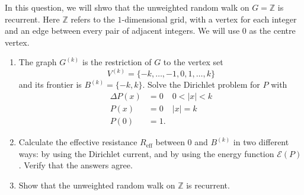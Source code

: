 \documentclass[12 pt, letterpaper]{hmcpset}
\begin{document}
\begin{problem}[45.]
	In this question, we will shwo that the unweighted random walk on $G = \mathbb{Z}$ is recurrent. Here $\mathbb{Z}$ refers to the  $1$-dimensional grid, with a vertex for each integer and an edge between every pair of adjacent integers. We will use $0$ as the centre vertex.
	\begin{enumerate}
		\item The graph $G^{(k)}$ is the restriction of $G$ to the vertex set
			\[
				V^{(k)} = \{ -k, \dots, -1, 0, 1, \dots, k \}
			\]
			and its frontier is $B^{(k)} = \{ -k, k \}$. Solve the Dirichlet problem for $P$ with
			\begin{align*}
				\Delta P(x) & = 0 & 0 < \lvert x \rvert < k \\
				P(x) & = 0 & \lvert x \rvert = k \\
				P(0) & = 1.
			\end{align*}

		\item Calculate the effective resistance $R_{\text{eff}}$ between $0$ and $B^{(k)}$ in two different ways: by using the Dirichlet current, and by using the energy function $\mathcal{E}(P)$. Verify that the answers agree.
		
		\item Show that the unweighted random walk on $\mathbb{Z}$ is recurrent.
	\end{enumerate}
\end{problem}
\end{document}
